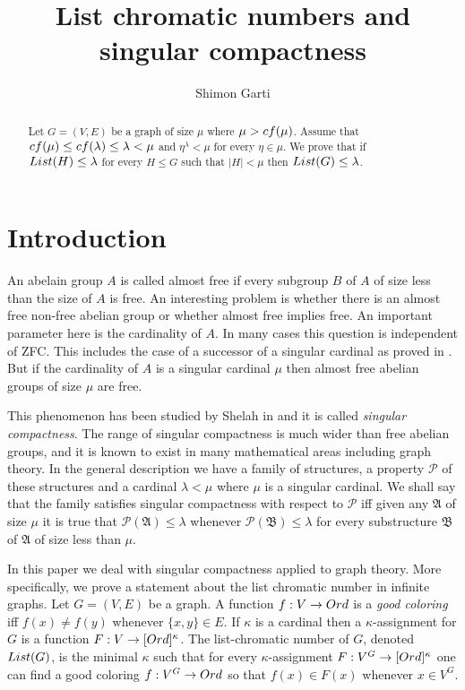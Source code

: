 \documentclass[11pt]{amsart}
\title{List chromatic numbers and singular compactness}
\author{Shimon Garti}
\theoremstyle{definition}
\theoremstyle{remark}
\newcommand{\cf}{{\rm cf}}
\begin{document}
\let\labeloriginal\label
\let\reforiginal\ref
\def\ref#1{\reforiginal{#1}}
\def\label#1{\labeloriginal{#1}}

\begin{abstract}
Let $G=(V,E)$ be a graph of size $\mu$ where $\mu>\cf(\mu)$.
Assume that $\cf(\mu)\leq\cf(\lambda)\leq\lambda<\mu$ and $\eta^\lambda<\mu$ for every $\eta\in\mu$.
We prove that if ${\rm List}(H)\leq\lambda$ for every $H\leq G$ such that $|H|<\mu$ then ${\rm List}(G)\leq\lambda$.
\end{abstract}

\maketitle

\newpage

\section{Introduction}

An abelain group $A$ is called almost free if every subgroup $B$ of $A$ of size less than the size of $A$ is free.
An interesting problem is whether there is an almost free non-free abelian group or whether almost free implies free.
An important parameter here is the cardinality of $A$.
In many cases this question is independent of \textsf{ZFC}.
This includes the case of a successor of a singular cardinal as proved in \cite{MR1249391}.
But if the cardinality of $A$ is a singular cardinal $\mu$ then almost free abelian groups of size $\mu$ are free.

This phenomenon has been studied by Shelah in \cite{MR389579} and it is called \emph{singular compactness}.
The range of singular compactness is much wider than free abelian groups, and it is known to exist in many mathematical areas including graph theory.
In the general description we have a family of structures, a property $\mathcal{P}$ of these structures and a cardinal $\lambda<\mu$ where $\mu$ is a singular cardinal.
We shall say that the family satisfies singular compactness with respect to $\mathcal{P}$ iff given any $\mathfrak{A}$ of size $\mu$ it is true that $\mathcal{P}(\mathfrak{A})\leq\lambda$ whenever $\mathcal{P}(\mathfrak{B})\leq\lambda$ for every substructure $\mathfrak{B}$ of $\mathfrak{A}$ of size less than $\mu$.

In this paper we deal with singular compactness applied to graph theory.
More specifically, we prove a statement about the list chromatic number in infinite graphs.
Let $G=(V,E)$ be a graph.
A function $f:V\rightarrow{\rm Ord}$ is a \emph{good coloring} iff $f(x)\neq f(y)$ whenever $\{x,y\}\in E$.
If $\kappa$ is a cardinal then a $\kappa$-assignment for $G$ is a function $F:V\rightarrow[{\rm Ord}]^\kappa$.
The list-chromatic number of $G$, denoted ${\rm List}(G)$, is the minimal $\kappa$ such that for every $\kappa$-assignment $F:V^G\rightarrow[{\rm Ord}]^\kappa$ one can find a good coloring $f:V^G\rightarrow{\rm Ord}$ so that $f(x)\in F(x)$ whenever $x\in V^G$.
\end{document}

